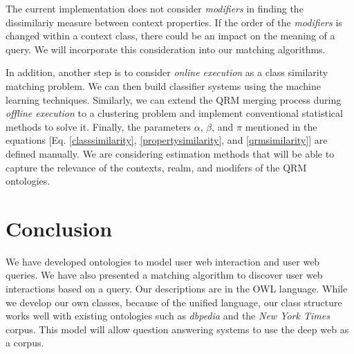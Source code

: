 \documentclass{IOS-Book-Article}
\begin{document}
The current implementation does not consider \textit{modifiers} in finding the dissimilariy measure between context properties.  If the order of the \textit{modifiers} is changed within a context class, there could be an impact on the meaning of a query.  We will incorporate this consideration into our matching algorithms.

In addition, another step is to consider \textit{online execution} as a class similarity matching problem.  We can then build classifier systems using the machine learning techniques. Similarly, we can extend the QRM merging process during \textit{offline execution} to a clustering problem and implement conventional statistical methods to solve it. Finally, the parameters $\alpha$, $\beta$, and $\pi$ mentioned in the equations [Eq. \eqref{classsimilarity}, \eqref{propertysimilarity}, and \eqref{qrmsimilarity}] are defined manually. We are considering estimation methods that will be able to capture the relevance of the contexts, realm, and modifers of the QRM ontologies.     



\section*{Conclusion}
We have developed ontologies to model user web interaction and user web queries. We have also presented a matching algorithm to discover user web interactions based on a query. Our descriptions are in the OWL language. While we develop our own classes, because of the unified language, our class structure works well with existing ontologies such as \emph{dbpedia} and the \emph{New York Times} corpus. This model will allow question answering systems to use the deep web as a corpus.





\end{document}
